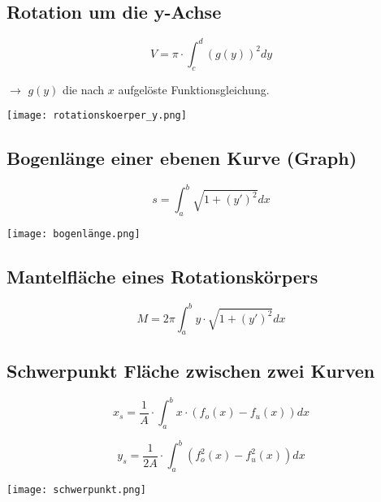 \begin{multicols*}{3}
    \subsection{Rotation um die y-Achse}

    \begin{multicols}{2}

        {$$V = \pi \cdot \int_{c}^{d}(g(y))^2dy$$}

        $\rightarrow$ $g(y)$ die nach $x$ aufgelöste Funktionsgleichung.

        \columnbreak
        \texttt{[image: rotationskoerper\_y.png]}
    \end{multicols}



    \subsection{Bogenlänge einer ebenen Kurve (Graph)}

    \begin{multicols}{2}

        {$$s = \int_{a}^{b}\sqrt{1+(y')^2}dx$$}

        \columnbreak
        \texttt{[image: bogenlänge.png]}


    \end{multicols}

    \subsection{Mantelfläche eines Rotationskörpers}

    {$$M = 2\pi \int_{a}^{b} y \cdot \sqrt{1+(y')^2}dx$$}
    \vfill\null
    \columnbreak
    \subsection{Schwerpunkt Fläche zwischen zwei Kurven}

    \begin{multicols}{2}

        {$$x_s =\frac{1}{A}\cdot \int_{a}^{b}x \cdot(f_o(x)-f_u(x))dx$$}

        {$$y_s =\frac{1}{2A}\cdot \int_{a}^{b}(f_o^2(x)-f_u^2(x))dx$$}

        \columnbreak
        \texttt{[image: schwerpunkt.png]}


    \end{multicols}



\end{multicols*}
